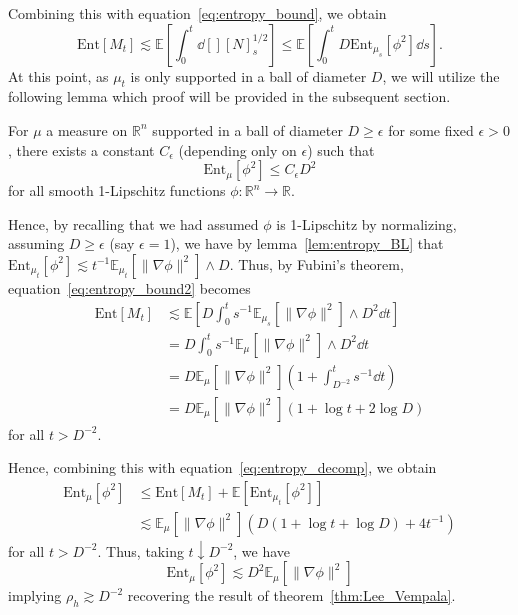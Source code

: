 Combining this with equation~\eqref{eq:entropy_bound}, we obtain 
\begin{equation}\label{eq:entropy_bound2}
  \text{Ent}[M_t] \lesssim \mathbb{E}\left[\int_0^t \dd[] [N]_s^{1 / 2}\right]
    \le \mathbb{E}\left[\int_0^t D \text{Ent}_{\mu_s}[\phi^2] \dd s\right].
\end{equation}
At this point, as \(\mu_t\) is only supported in a ball of diameter \(D\), 
we will utilize the following lemma which proof will be provided in the subsequent section.
\begin{lemma}\label{lem:entropy_supp}
  For \(\mu\) a measure on \(\mathbb{R}^n\) supported in a ball of diameter \(D \ge \epsilon\) for some fixed \(\epsilon > 0\), 
  there exists a constant \(C_\epsilon\) (depending only on \(\epsilon\)) such that 
  \[\text{Ent}_\mu[\phi^2] \le C_\epsilon D^2\]
  for all smooth 1-Lipschitz functions \(\phi : \mathbb{R}^n \to \mathbb{R}\).
\end{lemma}
Hence, by recalling that we had assumed \(\phi\) is 1-Lipschitz by normalizing, 
assuming \(D \ge \epsilon\) (say \(\epsilon = 1\)), we have by lemma~\ref{lem:entropy_BL} that 
\(\text{Ent}_{\mu_t}[\phi^2] \lesssim t^{-1}\mathbb{E}_{\mu_t}[\|\nabla \phi\|^2] \wedge D\). Thus, 
by Fubini's theorem, equation~\eqref{eq:entropy_bound2} becomes
\begin{align*}
  \text{Ent}[M_t] & \lesssim \mathbb{E}\left[D \int_0^t s^{-1}\mathbb{E}_{\mu_s}[\|\nabla \phi\|^2] \wedge D^2 \dd t\right]\\
    & = D \int_0^t s^{-1}\mathbb{E}_\mu[\|\nabla \phi\|^2] \wedge D^2 \dd t\\
    & = D \mathbb{E}_\mu[\|\nabla \phi\|^2] \left(1 + \int_{D^{-2}}^t s^{-1}\dd t\right)\\
    & = D \mathbb{E}_\mu[\|\nabla \phi\|^2] (1 + \log t + 2\log D)
\end{align*}
for all \(t > D^{-2}\).

Hence, combining this with equation~\eqref{eq:entropy_decomp}, we obtain
\begin{align*}
  \text{Ent}_\mu[\phi^2] & \le \text{Ent}[M_t] + \mathbb{E}[\text{Ent}_{\mu_t}[\phi^2]]\\
  & \lesssim \mathbb{E}_\mu[\|\nabla \phi\|^2](D (1 + \log t + \log D) + 4t^{-1})
\end{align*}
for all \(t > D^{-2}\). Thus, taking \(t \downarrow D^{-2}\), we have 
\[\text{Ent}_\mu[\phi^2] \lesssim D^2 \mathbb{E}_\mu[\|\nabla \phi\|^2]\]
implying \(\rho_h \gtrsim D^{-2}\) recovering the result of theorem~\ref{thm:Lee_Vempala}.

